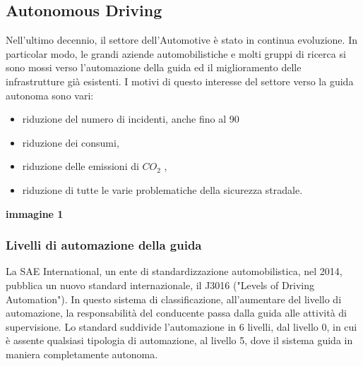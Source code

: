 \documentclass[14pt]{extarticle}
\begin{document}
\subsection{Autonomous Driving}
Nell'ultimo decennio, il settore dell'Automotive è stato in continua evoluzione. In particolar modo, le grandi aziende automobilistiche e molti gruppi di ricerca si sono mossi verso l'automazione della guida ed
il miglioramento delle infrastrutture già esistenti. I motivi di questo
interesse del settore verso la guida autonoma sono vari:
\begin{itemize}
\item riduzione del numero di incidenti, anche fino al 90%
\item  riduzione dei consumi,
\item  riduzione delle emissioni di $CO_{2}$ ,
\item  riduzione di tutte le varie problematiche della sicurezza
stradale.
\end{itemize}
\textbf{immagine 1}
\subsubsection{Livelli di automazione della guida}
La SAE International, un ente di standardizzazione automobilistica,  nel 2014, pubblica un nuovo standard internazionale, il J3016 ("Levels of Driving Automation").
In questo sistema di classificazione, all'aumentare del livello di automazione, la responsabilità del conducente passa dalla guida alle attività di
supervisione.
Lo standard suddivide l'automazione in 6 livelli, dal livello 0, in cui è assente qualsiasi tipologia di automazione, al livello 5, dove il sistema guida in maniera completamente autonoma.
\end{document}
